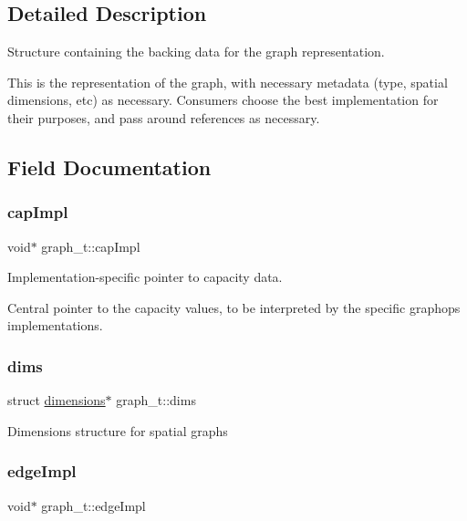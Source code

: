 \subsection{Detailed Description}
Structure containing the backing data for the graph representation. 

This is the representation of the graph, with necessary metadata (type, spatial dimensions, etc) as necessary. Consumers choose the best implementation for their purposes, and pass around references as necessary. 

\subsection{Field Documentation}
\mbox{\label{structgraph__t_ab85359c7dfbc46f84976a85c4104b1f5}} 
\subsubsection{\texorpdfstring{cap\+Impl}{capImpl}}
{\footnotesize\ttfamily void$\ast$ graph\+\_\+t\+::cap\+Impl}



Implementation-\/specific pointer to capacity data. 

Central pointer to the capacity values, to be interpreted by the specific graphops implementations. \mbox{\label{structgraph__t_ab0b7dd9b19e20a1564ba1f02ad41511e}} 
\subsubsection{\texorpdfstring{dims}{dims}}
{\footnotesize\ttfamily struct \hyperlink{graphdata_8h_a08b79828d8e700b1ff86fc235a83089f}{dimensions}$\ast$ graph\+\_\+t\+::dims}

Dimensions structure for spatial graphs \mbox{\label{structgraph__t_acadea26a56e788cb109413045138faba}} 
\subsubsection{\texorpdfstring{edge\+Impl}{edgeImpl}}
{\footnotesize\ttfamily void$\ast$ graph\+\_\+t\+::edge\+Impl}



